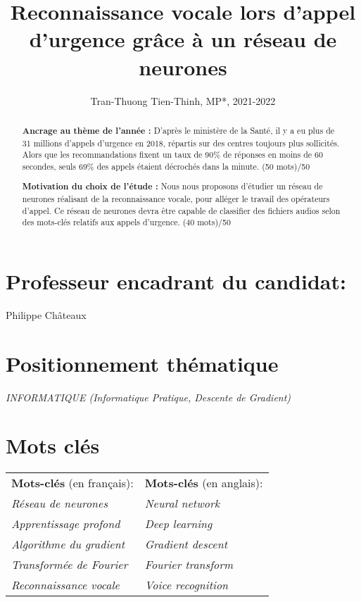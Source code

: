\documentclass[12pt,a4paper, french]{article}
\title{Reconnaissance vocale lors d'appel d'urgence grâce à un réseau de neurones}
\author{Tran-Thuong Tien-Thinh, MP*, 2021-2022}
\date{}
\begin{document}
\maketitle

\begin{abstract}
\textbf{Ancrage au thème de l'année :}
D'après le ministère de la Santé, il y a eu plus de 31 millions d'appels d'urgence en 2018, répartis sur des centres toujours plus sollicités. Alors que les recommandations fixent un taux de 90\% de réponses en moins de 60 secondes, seuls 69\% des appels étaient décrochés dans la minute.  (50 mots)/50

\textbf{Motivation du choix de l’étude :} Nous nous proposons d'étudier un réseau de neurones réalisant de la reconnaissance vocale, pour alléger le travail des opérateurs d'appel. Ce réseau de neurones devra être capable de classifier des fichiers audios selon des mots-clés relatifs aux appels d’urgence. (40 mots)/50
\end{abstract}

\section*{Professeur encadrant du candidat:}
Philippe Châteaux

\section*{Positionnement thématique}
\noindent\textit{INFORMATIQUE (Informatique Pratique, Descente de Gradient)}

\section*{Mots clés}
\begin{tabular}{l l}
    \textbf{Mots-clés} (en français): & \textbf{Mots-clés} (en anglais): \\
    \textit{Réseau de neurones} & \textit{Neural network} \\
    \textit{Apprentissage profond} & \textit{Deep learning} \\
    \textit{Algorithme du gradient} & \textit{Gradient descent} \\
    \textit{Transformée de Fourier} & \textit{Fourier transform} \\
    \textit{Reconnaissance vocale} & \textit{Voice recognition} \\
\end{tabular}
\end{document}
